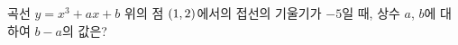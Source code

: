곡선 $y=x^3+ax+b$ 위의 점 $(1{,}\mkern3mu\mathopen{}2)$에서의 접선의 기울기가 $-5$일 때, 상수 $a$, $b$에 대하여 $b-a$의 값은?
